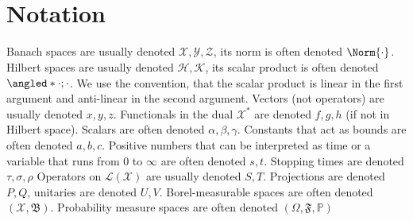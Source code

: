 \section{Notation}

\begin{remark}[Notation]
    Banach spaces are usually denoted \( \mathcal{X} , \mathcal{Y}, \mathcal{Z}\), its norm is often denoted \( \Norm{\cdot}_{} \). \\
    Hilbert spaces are usually denoted \( \mathcal{H} , \mathcal{K}\), its scalar product is often denoted \( \angled*{\cdot;\cdot} \). We use the convention, that the scalar product is linear in the first argument and anti-linear in the second argument. 
    Vectors (not operators) are usually denoted \( x,y,z \). Functionals in the dual \( \mathcal{X}^{*} \) are denoted \( f,g,h \) (if not in Hilbert space). 
    Scalars are often denoted \( \alpha,\beta,\gamma \). Constants that act as bounds are often denoted \( a,b,c \). 
    Positive numbers that can be interpreted as time or a variable that runs from 0 to \( \infty  \) are often denoted \( s,t \). Stopping times are denoted \( \tau, \sigma, \rho \)
    Operators on \( \mathcal{L}(\mathcal{X}) \) are usually denoted \( S,T \). Projections are denoted \( P,Q \), unitaries are denoted \( U,V \). 
    Borel-measurable spaces are often denoted \( (\mathcal{X},\mathfrak{B}) \). 
    Probability measure spaces are often denoted \( (\Omega , \mathfrak{F}, \mathbb{P}) \) 
\end{remark}

